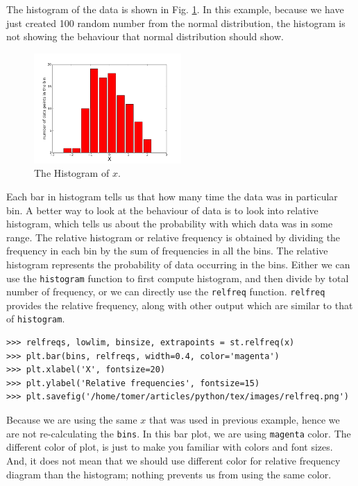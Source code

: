 \documentclass[10pt]{book}
\begin{document}
{The histogram of the data is shown in Fig. \ref{fig:hist}. In this example, because we have just created 100 random number from the normal distribution, the histogram is not showing the behaviour that normal distribution should show.  

\beforefig
\begin{figure}[h!]
  \centering
    \includegraphics[width=0.5\textwidth]{images/hist.png}
  \caption{The Histogram of $x$.}
   \label{fig:hist}
\end{figure}
\afterfig

Each bar in histogram tells us that how many time the data was in particular bin. A better way to look at the behaviour of data is to look into relative histogram, which tells us about the probability with which data was in some range. The relative histogram or relative frequency is obtained by dividing the frequency in each bin by the sum of frequencies in all the bins. The relative histogram represents the probability of data occurring in the bins. Either we can use the \verb"histogram" function to first compute histogram, and then divide by total number of frequency, or we can directly use the \verb"relfreq" function. \verb"relfreq" provides the relative frequency, along with other output which are similar to that of \verb"histogram".
\beforeverb \begin{verbatim}
>>> relfreqs, lowlim, binsize, extrapoints = st.relfreq(x)
>>> plt.bar(bins, relfreqs, width=0.4, color='magenta')
>>> plt.xlabel('X', fontsize=20)
>>> plt.ylabel('Relative frequencies', fontsize=15)
>>> plt.savefig('/home/tomer/articles/python/tex/images/relfreq.png')
\end{verbatim}
\afterverb
Because we are using the same $x$ that was used in previous example, hence we are not re-calculating the \verb"bins". In this bar plot, we are using \verb"magenta" color. The different color of plot, is just to make you familiar with colors and font sizes. And, it does not mean that we should use different color for relative frequency diagram than the histogram; nothing prevents us from using the same color.

}
\end{document}
